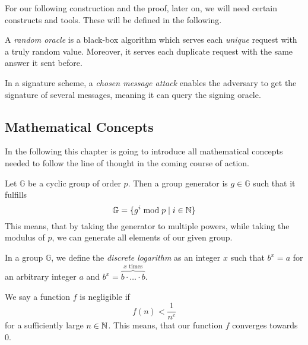 For our following construction and the proof, later on, we will need certain constructs and tools.
These will be defined in the following.

\begin{definition}
  A \textit{random oracle} is a black-box algorithm which serves each \textit{unique} request with a truly random value. Moreover, it serves each duplicate request with the same answer it sent before.
\end{definition}

\begin{definition}
  In a signature scheme, a \textit{chosen message attack} enables the adversary to get the signature of several messages, meaning it can query the signing oracle.
\end{definition}

\subsection{Mathematical Concepts}
  In the following this chapter is going to introduce all mathematical concepts needed to follow the line of thought in the coming course of action. 
  
  \begin{definition}
    Let \(\mathbb{G}\) be a cyclic group of order \(p\). Then a group generator is \(g\in\mathbb{G}\) such that it fulfills
      \[\mathbb{G} =  \{ g^i \bmod p \mid i\in\mathbb{N} \}\]
    This means, that by taking the generator to multiple powers, while taking the modulus of \(p\), we can generate all elements of our given group.
  \end{definition}

  \begin{definition}
    In a group \(\mathbb{G}\), we define the \textit{discrete logarithm} as an integer \(x\) such that \(b^x = a\) for an arbitrary integer \(a\) and \(b^x = \overbrace{b\cdot \ldots\cdot b}^{x \text{ times}}\).
  \end{definition}

  \begin{definition}
    We say a function \(f\) is negligible if 
    \[f(n) < \frac{1}{n^c}\]
    for a sufficiently large \(n\in\mathbb{N}\). This means, that our function \(f\) converges towards 0. 
  \end{definition}

